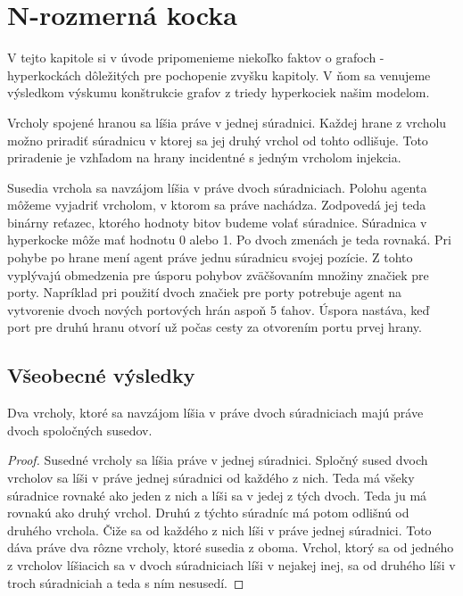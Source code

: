 {}



\chapter{N-rozmerná kocka}
V tejto kapitole si v úvode pripomenieme niekoľko faktov o grafoch - 
hyperkockách dôležitých pre pochopenie zvyšku kapitoly. V ňom sa venujeme
výsledkom výskumu konštrukcie grafov z triedy hyperkociek našim modelom.

Vrcholy spojené hranou sa líšia práve v jednej súradnici. Každej hrane z
vrcholu možno priradiť súradnicu v ktorej sa jej druhý vrchol od tohto
odlišuje. Toto priradenie je vzhľadom na hrany incidentné s jedným vrcholom
 injekcia.

Susedia vrchola sa navzájom líšia v práve dvoch súradniciach. Polohu agenta
môžeme vyjadriť vrcholom, v ktorom sa práve nachádza. Zodpovedá jej teda
binárny reťazec, ktorého hodnoty bitov budeme volať súradnice. Súradnica v
hyperkocke môže mať hodnotu 0 alebo 1. Po dvoch zmenách je teda rovnaká.
 Pri pohybe po hrane mení agent práve jednu súradnicu svojej pozície. 
Z tohto vyplývajú obmedzenia
pre úsporu pohybov zväčšovaním množiny značiek pre porty. 
Napríklad pri použití dvoch
značiek pre porty potrebuje agent na vytvorenie dvoch nových portových hrán
aspoň 5 ťahov. Úspora nastáva, keď port pre druhú hranu otvorí už počas
cesty za otvorením portu prvej hrany.

\section{Všeobecné výsledky}

\begin{veta}
Dva vrcholy, ktoré sa navzájom líšia v práve dvoch súradniciach majú práve dvoch
spoločných susedov.
\end{veta}
\begin{proof}
Susedné vrcholy sa líšia práve v jednej súradnici. Spločný sused dvoch
vrcholov sa líši v práve jednej súradnici od každého z nich. Teda má všeky
súradnice rovnaké ako jeden z nich a líši sa v jedej z tých dvoch. Teda ju
má rovnakú ako druhý vrchol. Druhú z týchto súradníc má potom odlišnú od
druhého vrchola. Čiže sa od každého z nich líši v práve jednej súradnici.
Toto dáva práve dva rôzne vrcholy, ktoré susedia z oboma. Vrchol, ktorý
sa od jedného z vrcholov líšiacich sa v dvoch súradniciach líši v nejakej
inej, sa od druhého líši v troch súradniciah a teda s ním nesusedí.
\end{proof}

